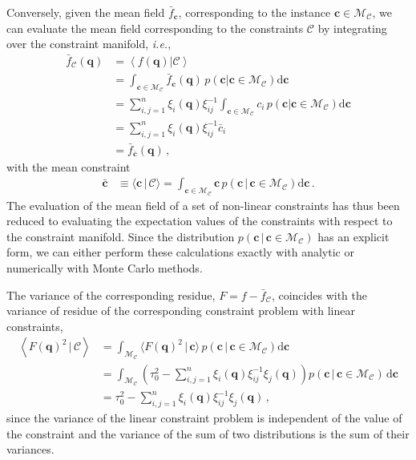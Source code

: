 \documentclass[a4paper, 11pt]{article}
\begin{document}
Conversely, given the mean field $\bar{f}_{\bm{c}}$, corresponding to the instance $\bm{c} \in \mathcal{M}_{\mathcal{C}}$, we can evaluate the mean field corresponding to the constraints $\mathcal{C}$ by integrating over the constraint manifold, \textit{i.e.},
\begin{align}
\bar{f}_{\mathcal{C}}(\bm{q}) 
&=\left\langle f(\bm{q})|\mathcal{C}\right \rangle \nonumber\\
&= \int_{\bm{c} \in \mathcal{M}_{\mathcal{C}}} \bar{f}_{\bm{c}}(\bm{q})\, p(\bm{c}|\bm{c}\in \mathcal{M}_{\mathcal{C}}) \mathrm{d}\bm{c}\nonumber\\
&= \sum_{i,j=1}^n\xi_i(\bm{q}) \xi_{ij}^{-1}\int_{\bm{c} \in \mathcal{M}_{\mathcal{C}}}  c_i\, p(\bm{c}|\bm{c}\in \mathcal{M}_{\mathcal{C}}) \mathrm{d}\bm{c}\nonumber\\
&= \sum_{i,j=1}^n \xi_i(\bm{q}) \xi_{ij}^{-1} \bar{c}_i\nonumber\\
&= \bar{f}_{\bar{\bm{c}}}(\bm{q})\,,
\end{align}
with the mean constraint
\begin{align}
\bar{\bm{c}} &\equiv \langle \bm{c} \,|\, \mathcal{C}\rangle = \int_{\bm{c} \in \mathcal{M}_{\mathcal{C}}}  \bm{c}\, p(\bm{c}\,|\,\bm{c}\in \mathcal{M}_{\mathcal{C}}) \mathrm{d}\bm{c}\,.
\end{align}
The evaluation of the mean field of a set of non-linear constraints has thus been reduced to evaluating the expectation values of the constraints with respect to the constraint manifold. Since the distribution $p(\bm{c}\,|\,\bm{c}\in \mathcal{M}_{\mathcal{C}})$ has an explicit form, we can either perform these calculations exactly with analytic or numerically with Monte Carlo methods.

The variance of the corresponding residue, $F = f - \bar{f}_{\mathcal{C}}$, coincides with the variance of residue of the corresponding constraint problem with linear constraints,
\begin{align}
\left \langle F(\bm{q})^2\,|\,\mathcal{C}\right\rangle &= \int_{\mathcal{M}_\mathcal{C}} \langle F(\bm{q})^2\, |\, \bm{c}\rangle\, p(\bm{c}\,|\, \bm{c} \in \mathcal{M}_\mathcal{C})\mathrm{d}\bm{c}\nonumber\\
&=\int_{\mathcal{M}_\mathcal{C}} 
\left( \tau_0^2 - \sum_{i,j=1}^n\xi_i(\bm{q}) \xi_{ij}^{-1} \xi_j(\bm{q})\right) p(\bm{c}\,|\,\bm{c}\in \mathcal{M}_\mathcal{C})\,\mathrm{d}\bm{c}\nonumber\\
&= \tau_0^2 - \sum_{i,j=1}^n\xi_i(\bm{q}) \xi_{ij}^{-1} \xi_j(\bm{q})\,,
\end{align}
since the variance of the linear constraint problem is independent of the value of the constraint and the variance of the sum of two distributions is the sum of their variances. 
\end{document}

